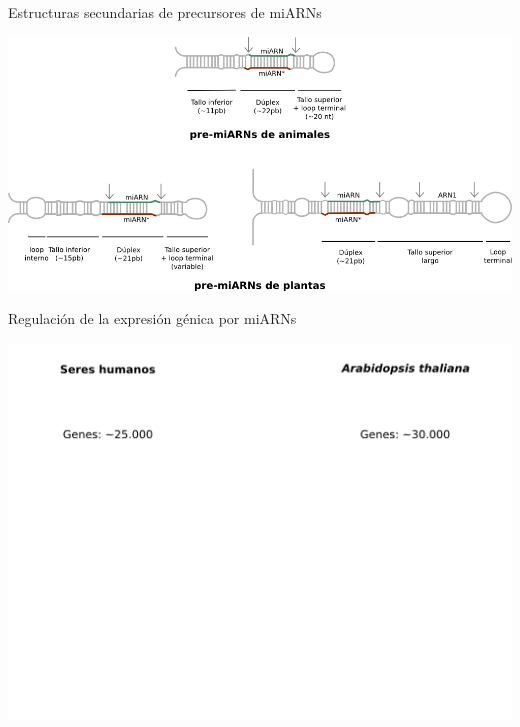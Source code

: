 \documentclass{beamer}
\begin{document}
\begin{frame}{Estructuras secundarias de precursores de miARNs}
	\begin{center}
		\includegraphics[width=1\textwidth]{img/ss_precursores.png}
	\end{center}
\end{frame}

\begin{frame}{Regulación de la expresión génica por miARNs}
        \begin{center}
            \includegraphics[width=1\textwidth]{img/exp_gen01.png}
        \end{center}
\end{frame}
\end{document}
